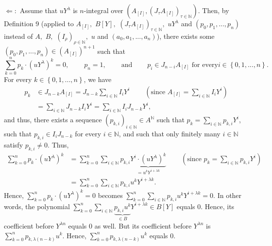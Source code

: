 \documentclass[12pt,final,notitlepage,onecolumn]{article}%
\begin{document}
$\Longleftarrow:$ Assume that $uY^{\lambda}$ is $n$-integral over $\left(
A_{\left[  I\right]  },\left(  J_{\tau}A_{\left[  I\right]  }\right)
_{\tau\in\mathbb{N}}\right)  $. Then, by Definition 9 (applied to $A_{\left[
I\right]  },$ $B\left[  Y\right]  ,$ $\left(  J_{\tau}A_{\left[  I\right]
}\right)  _{\tau\in\mathbb{N}},$ $uY^{\lambda}$ and $\left(  p_{0}%
,p_{1},...,p_{n}\right)  $ instead of $A,$ $B,$ $\left(  I_{\rho}\right)
_{\rho\in\mathbb{N}},$ $u$ and $\left(  a_{0},a_{1},...,a_{n}\right)  $),
there exists some $\left(  p_{0},p_{1},...,p_{n}\right)  \in\left(  A_{\left[
I\right]  }\right)  ^{n+1}$ such that%
\[
\sum\limits_{k=0}^{n}p_{k}\cdot\left(  uY^{\lambda}\right)  ^{k}%
=0,\ \ \ \ \ \ \ \ \ \ p_{n}=1,\ \ \ \ \ \ \ \ \ \ \text{and}%
\ \ \ \ \ \ \ \ \ \ p_{i}\in J_{n-i}A_{\left[  I\right]  }\text{ for every
}i\in\left\{  0,1,...,n\right\}  .
\]
For every $k\in\left\{  0,1,...,n\right\}  $, we have%
\begin{align*}
p_{k}  &  \in J_{n-k}A_{\left[  I\right]  }=J_{n-k}\sum\limits_{i\in
\mathbb{N}}I_{i}Y^{i}\ \ \ \ \ \ \ \ \ \ \left(  \text{since }A_{\left[
I\right]  }=\sum\limits_{i\in\mathbb{N}}I_{i}Y^{i}\right) \\
&  =\sum\limits_{i\in\mathbb{N}}J_{n-k}I_{i}Y^{i}=\sum\limits_{i\in\mathbb{N}%
}I_{i}J_{n-k}Y^{i},
\end{align*}
and thus, there exists a sequence $\left(  p_{k,i}\right)  _{i\in\mathbb{N}%
}\in A^{\mathbb{N}}$ such that $p_{k}=\sum\limits_{i\in\mathbb{N}}p_{k,i}%
Y^{i}$, such that $p_{k,i}\in I_{i}J_{n-k}$ for every $i\in\mathbb{N}$, and
such that only finitely many $i\in\mathbb{N}$ satisfy $p_{k,i}\neq0$. Thus,%
\begin{align*}
\sum\limits_{k=0}^{n}p_{k}\cdot\left(  uY^{\lambda}\right)  ^{k}  &
=\sum\limits_{k=0}^{n}\sum\limits_{i\in\mathbb{N}}p_{k,i}\underbrace{Y^{i}%
\cdot\left(  uY^{\lambda}\right)  ^{k}}_{=u^{k}Y^{i+\lambda k}}%
\ \ \ \ \ \ \ \ \ \ \left(  \text{since }p_{k}=\sum\limits_{i\in\mathbb{N}%
}p_{k,i}Y^{i}\right) \\
&  =\sum\limits_{k=0}^{n}\sum\limits_{i\in\mathbb{N}}p_{k,i}u^{k}Y^{i+\lambda
k}.
\end{align*}
Hence, $\sum\limits_{k=0}^{n}p_{k}\cdot\left(  uY^{\lambda}\right)  ^{k}=0$
becomes $\sum\limits_{k=0}^{n}\sum\limits_{i\in\mathbb{N}}p_{k,i}%
u^{k}Y^{i+\lambda k}=0$. In other words, the polynomial $\sum\limits_{k=0}%
^{n}\sum\limits_{i\in\mathbb{N}}\underbrace{p_{k,i}u^{k}}_{\in B}Y^{i+\lambda
k}\in B\left[  Y\right]  $ equals $0$. Hence, its coefficient before
$Y^{\lambda n}$ equals $0$ as well. But its coefficient before $Y^{\lambda n}$
is $\sum\limits_{k=0}^{n}p_{k,\lambda\left(  n-k\right)  }u^{k}$. Hence,
$\sum\limits_{k=0}^{n}p_{k,\lambda\left(  n-k\right)  }u^{k}$ equals $0$.
\end{document}
